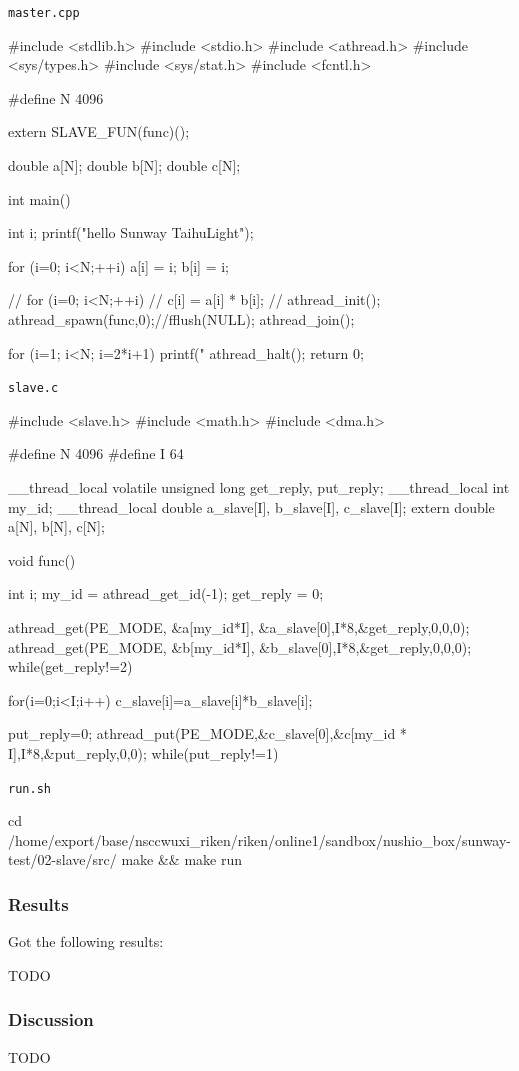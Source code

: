 \verb`master.cpp`
\begin{code}
#include <stdlib.h>
#include <stdio.h>
#include <athread.h>
#include <sys/types.h>
#include <sys/stat.h>
#include <fcntl.h>

#define N 4096


extern SLAVE_FUN(func)();

double a[N];
double b[N];
double c[N];

int main() {
  int i;
  printf("hello Sunway TaihuLight\n");

  for (i=0; i<N;++i){
    a[i] = i;
    b[i] = i;
  }

  // for (i=0; i<N;++i){
  //   c[i] = a[i] * b[i];
  // }
  athread_init();
  athread_spawn(func,0);//fflush(NULL);
  athread_join();

  for (i=1; i<N; i=2*i+1){
    printf("%
  }
  athread_halt();
  return 0;
}

\end{code}

\verb`slave.c`
\begin{code}
#include <slave.h>
#include <math.h>
#include <dma.h>

#define N 4096
#define I 64

__thread_local volatile unsigned long get_reply, put_reply;
__thread_local int my_id;
__thread_local double a_slave[I], b_slave[I], c_slave[I];
extern double a[N], b[N], c[N];

void func() {
  int i;
  my_id = athread_get_id(-1);
  get_reply = 0;

  athread_get(PE_MODE, &a[my_id*I], &a_slave[0],I*8,&get_reply,0,0,0);
  athread_get(PE_MODE, &b[my_id*I], &b_slave[0],I*8,&get_reply,0,0,0);
  while(get_reply!=2) {}

  for(i=0;i<I;i++){
    c_slave[i]=a_slave[i]*b_slave[i];
  }

  put_reply=0;
  athread_put(PE_MODE,&c_slave[0],&c[my_id * I],I*8,&put_reply,0,0);
  while(put_reply!=1) {}

}

\end{code}

\verb`run.sh`
\begin{code}

cd /home/export/base/nsccwuxi_riken/riken/online1/sandbox/nushio_box/sunway-test/02-slave/src/
make && make run
    
\end{code}

\subsubsection{Results}

Got the following results:

\begin{code}
TODO

\end{code}

\subsubsection{Discussion}

TODO


